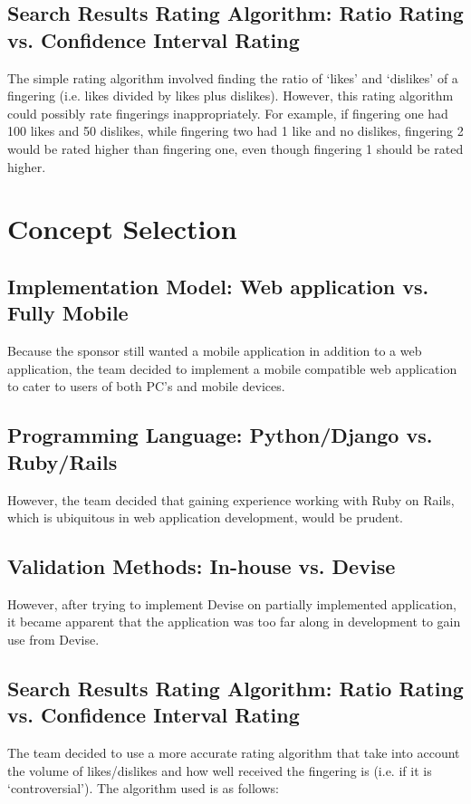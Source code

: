 \documentclass[12pt,english]{article}
\begin{document}
\subsection{Search Results Rating Algorithm: Ratio Rating vs. Confidence Interval Rating}
The simple rating algorithm involved finding the ratio of `likes'
and `dislikes' of a fingering (i.e. likes divided by likes plus dislikes).
However, this rating algorithm could possibly rate fingerings inappropriately.
For example, if fingering one had 100 likes and 50 dislikes, while
fingering two had 1 like and no dislikes, fingering 2 would be rated
higher than fingering one, even though fingering 1 should be rated
higher.


\section{Concept Selection}
\subsection{Implementation Model: Web application vs. Fully Mobile}
Because the sponsor still wanted a mobile application in addition
to a web application, the team decided to implement a mobile compatible
web application to cater to users of both PC's and mobile devices.

\subsection{Programming Language: Python/Django vs. Ruby/Rails}
However, the team decided that gaining experience working with Ruby
on Rails, which is ubiquitous in web application development, would
be prudent.

\subsection{Validation Methods: In-house vs. Devise}
However, after trying to implement Devise on partially implemented
application, it became apparent that the application was too far along
in development to gain use from Devise.


\subsection{Search Results Rating Algorithm: Ratio Rating vs. Confidence Interval Rating}
The team decided to use a more accurate rating algorithm that take
into account the volume of likes/dislikes and how well received the
fingering is (i.e. if it is `controversial'). The algorithm used is
as follows:
\end{document}
